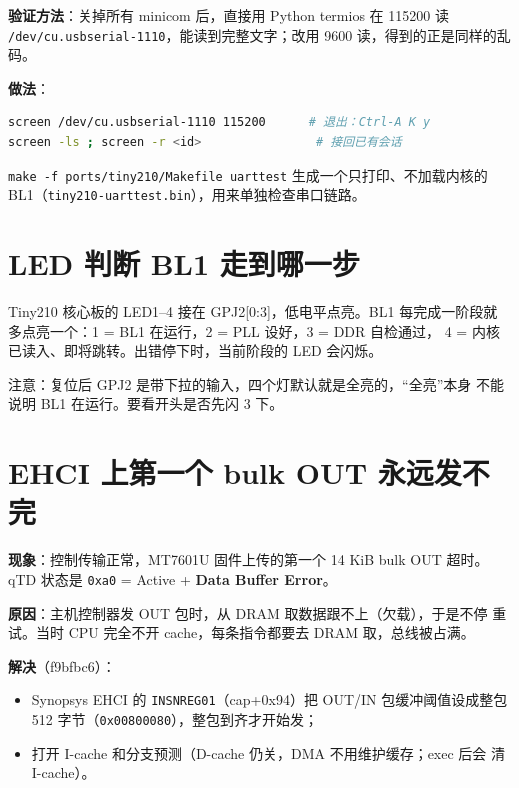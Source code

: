 \textbf{验证方法}：关掉所有 minicom 后，直接用 Python termios 在 115200
读
\passthrough{\lstinline!/dev/cu.usbserial-1110!}，能读到完整文字；改用
9600 读，得到的正是同样的乱码。

\textbf{做法}：

\begin{lstlisting}[language=sh]
screen /dev/cu.usbserial-1110 115200      # 退出：Ctrl-A K y
screen -ls ; screen -r <id>                # 接回已有会话
\end{lstlisting}

\passthrough{\lstinline!make -f ports/tiny210/Makefile uarttest!}
生成一个只打印、不加载内核的
BL1（\passthrough{\lstinline!tiny210-uarttest.bin!}），用来单独检查串口链路。

\section{LED 判断 BL1
走到哪一步}\label{led-ux5224ux65ad-bl1-ux8d70ux5230ux54eaux4e00ux6b65}

Tiny210 核心板的 LED1--4 接在 GPJ2{[}0:3{]}，低电平点亮。BL1
每完成一阶段就 多点亮一个：1 = BL1 在运行，2 = PLL 设好，3 = DDR
自检通过， 4 = 内核已读入、即将跳转。出错停下时，当前阶段的 LED 会闪烁。

注意：复位后 GPJ2 是带下拉的输入，四个灯默认就是全亮的，``全亮''本身
不能说明 BL1 在运行。要看开头是否先闪 3 下。

\section{EHCI 上第一个 bulk OUT
永远发不完}\label{ehci-ux4e0aux7b2cux4e00ux4e2a-bulk-out-ux6c38ux8fdcux53d1ux4e0dux5b8c}

\textbf{现象}：控制传输正常，MT7601U 固件上传的第一个 14 KiB bulk OUT
超时。 qTD 状态是 \passthrough{\lstinline!0xa0!} = Active + \textbf{Data
Buffer Error}。

\textbf{原因}：主机控制器发 OUT 包时，从 DRAM
取数据跟不上（欠载），于是不停 重试。当时 CPU 完全不开
cache，每条指令都要去 DRAM 取，总线被占满。

\textbf{解决}（f9bfbc6）：

\begin{itemize}
\tightlist
\item
  Synopsys EHCI 的 \passthrough{\lstinline!INSNREG01!}（cap+0x94）把
  OUT/IN 包缓冲阈值设成整包 512
  字节（\passthrough{\lstinline!0x00800080!}），整包到齐才开始发；
\item
  打开 I-cache 和分支预测（D-cache 仍关，DMA 不用维护缓存；exec 后会 清
  I-cache）。
\end{itemize}

